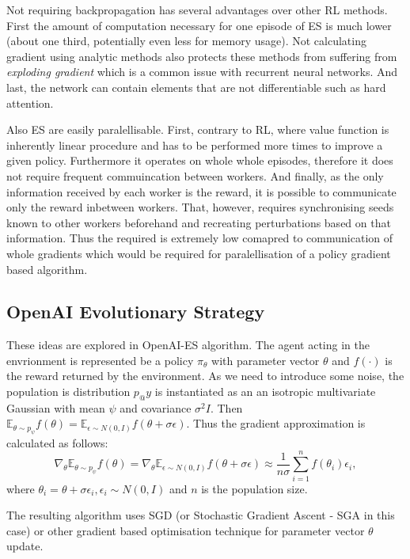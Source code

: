 Not requiring backpropagation has several advantages over other RL methods. First the amount of computation necessary for one episode of ES is much lower (about one third, potentially even less for memory usage). Not calculating gradient using analytic methods also protects these methods from suffering from \emph{exploding gradient} which is a common issue with recurrent neural networks. And last, the network can contain elements that are not differentiable such as hard attention.

Also ES are easily paralellisable. First, contrary to RL, where value function is inherently linear procedure and has to be performed more times to improve a given policy. Furthermore it operates on whole whole episodes, therefore it does not require frequent commuincation between workers. And finally, as the only information received by each worker is the reward, it is possible to communicate only the reward inbetween workers. That, however, requires synchronising seeds known to other workers beforehand and recreating perturbations based on that information. Thus the required is extremely low comapred to communication of whole gradients which would be required for paralellisation of a policy gradient based algorithm.

\subsection{OpenAI Evolutionary Strategy}
\label{subsec:openai-es}
These ideas are explored in OpenAI-ES algorithm. The agent acting in the envrionment is represented be a policy $\pi_\theta$  with parameter vector $\theta$ and $f(\cdot)$ is the reward returned by the environment. As we need to introduce some noise, the population is distribution $p_@y$ is instantiated as an an isotropic multivariate Gaussian with mean $\psi$ and covariance $\sigma^2I$. Then $\mathbb{E}_{\theta\sim p_\psi}f(\theta) = \mathbb{E}_{\epsilon\sim N(0,I)}f(\theta+\sigma\epsilon)$. Thus the gradient approximation is calculated as follows:
\begin{equation}
    \nabla_{\theta}\mathbb{E}_{\theta\sim p_\psi}f(\theta) =\nabla_{\theta}\mathbb{E}_{\epsilon\sim N(0,I)}f(\theta+\sigma\epsilon)\approx \frac{1}{n\sigma}\sum_{i=1}^n f(\theta_i)\epsilon_i,  
\end{equation}
where $\theta_i = \theta + \sigma\epsilon_i, \epsilon_i\sim N(0,I)$ and $n$ is the population size.

The resulting algorithm uses SGD (or Stochastic Gradient Ascent - SGA in this case) or other gradient based optimisation technique for parameter vector $\theta$ update.


